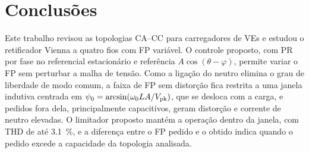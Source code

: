 \section{Conclusões}
\label{sec:conclusoes}

Este trabalho revisou as topologias CA--CC para carregadores
de VEs e estudou o retificador Vienna a quatro fios com FP
variável. O controle proposto, com PR por fase no referencial
estacionário e referência $A\cos(\theta-\varphi)$, permite variar o FP sem
perturbar a malha de tensão. Como a ligação do neutro elimina o grau de liberdade de modo comum, a faixa de FP sem distorção fica restrita a uma janela indutiva centrada
em $\psi_0 = \arcsin(\omega_0 L A/V_{\mathrm{pk}})$, que se desloca com a carga, e
pedidos fora dela, principalmente capacitivos, geram distorção
e corrente de neutro elevadas. O limitador proposto mantém a
operação dentro da janela, com THD de até \SI{3,1}{\percent}, e a diferença entre o FP pedido e o obtido indica quando o pedido
excede a capacidade da topologia analisada.

